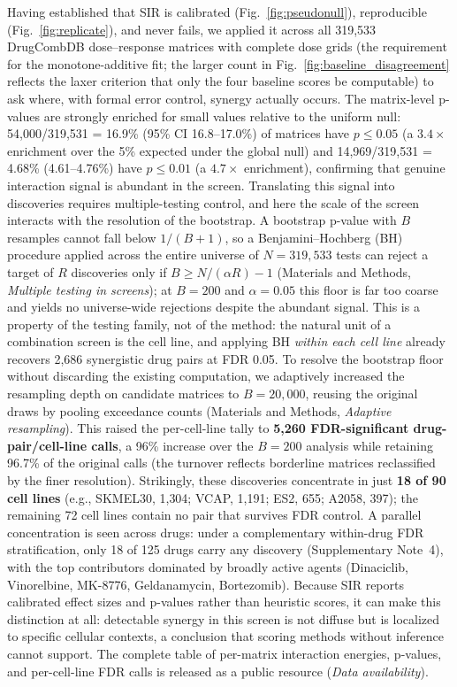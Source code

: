 \documentclass[unnumsec,webpdf,contemporary,large]{oup-authoring-template}
\begin{document}
Having established that SIR is calibrated (Fig.~\ref{fig:pseudonull}), reproducible (Fig.~\ref{fig:replicate}), and never fails, we applied it across all 319{,}533 DrugCombDB dose--response matrices with complete dose grids (the requirement for the monotone-additive fit; the larger count in Fig.~\ref{fig:baseline_disagreement} reflects the laxer criterion that only the four baseline scores be computable) to ask where, with formal error control, synergy actually occurs.
The matrix-level p-values are strongly enriched for small values relative to the uniform null: 54{,}000/319{,}531 = 16.9\% (95\% CI 16.8--17.0\%) of matrices have $p\le 0.05$ (a $3.4\times$ enrichment over the 5\% expected under the global null) and 14{,}969/319{,}531 = 4.68\% (4.61--4.76\%) have $p\le 0.01$ (a $4.7\times$ enrichment), confirming that genuine interaction signal is abundant in the screen.
Translating this signal into discoveries requires multiple-testing control, and here the scale of the screen interacts with the resolution of the bootstrap.
A bootstrap p-value with $B$ resamples cannot fall below $1/(B+1)$, so a Benjamini--Hochberg (BH) procedure applied across the entire universe of $N=319{,}533$ tests can reject a target of $R$ discoveries only if $B \ge N/(\alpha R) - 1$ (Materials and Methods, \emph{Multiple testing in screens}); at $B=200$ and $\alpha=0.05$ this floor is far too coarse and yields no universe-wide rejections despite the abundant signal.
This is a property of the testing family, not of the method: the natural unit of a combination screen is the cell line, and applying BH \emph{within each cell line} already recovers 2{,}686 synergistic drug pairs at FDR 0.05.
To resolve the bootstrap floor without discarding the existing computation, we adaptively increased the resampling depth on candidate matrices to $B=20{,}000$, reusing the original draws by pooling exceedance counts (Materials and Methods, \emph{Adaptive resampling}).
This raised the per-cell-line tally to \textbf{5{,}260 FDR-significant drug-pair/cell-line calls}, a 96\% increase over the $B=200$ analysis while retaining 96.7\% of the original calls (the turnover reflects borderline matrices reclassified by the finer resolution).
Strikingly, these discoveries concentrate in just \textbf{18 of 90 cell lines} (e.g., SKMEL30, 1{,}304; VCAP, 1{,}191; ES2, 655; A2058, 397); the remaining 72 cell lines contain no pair that survives FDR control.
A parallel concentration is seen across drugs: under a complementary within-drug FDR stratification, only 18 of 125 drugs carry any discovery (Supplementary Note~4), with the top contributors dominated by broadly active agents (Dinaciclib, Vinorelbine, MK-8776, Geldanamycin, Bortezomib).
Because SIR reports calibrated effect sizes and p-values rather than heuristic scores, it can make this distinction at all: detectable synergy in this screen is not diffuse but is localized to specific cellular contexts, a conclusion that scoring methods without inference cannot support.
The complete table of per-matrix interaction energies, p-values, and per-cell-line FDR calls is released as a public resource (\emph{Data availability}).
\end{document}

